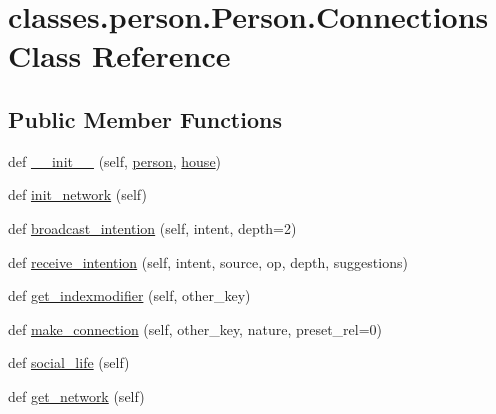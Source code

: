 \hypertarget{classclasses_1_1person_1_1Person_1_1Connections}{}\section{classes.\+person.\+Person.\+Connections Class Reference}
\label{classclasses_1_1person_1_1Person_1_1Connections}
\subsection*{Public Member Functions}
\begin{DoxyCompactItemize}
\item 
def \hyperlink{classclasses_1_1person_1_1Person_1_1Connections_a26784603675515a5591a86e2c05c235f}{\+\_\+\+\_\+init\+\_\+\+\_\+} (self, \hyperlink{classclasses_1_1person_1_1Person_1_1Connections_a7106d04e396d6fd3c4adab956767b97b}{person}, \hyperlink{classclasses_1_1person_1_1Person_1_1Connections_a80dd3f370e85960b4420131f9eddc20e}{house})
\item 
def \hyperlink{classclasses_1_1person_1_1Person_1_1Connections_ac432972c3928e6dfa3ae1566e2de914b}{init\+\_\+network} (self)
\item 
def \hyperlink{classclasses_1_1person_1_1Person_1_1Connections_a330ae3e700f3062293f1f53f617453eb}{broadcast\+\_\+intention} (self, intent, depth=2)
\item 
def \hyperlink{classclasses_1_1person_1_1Person_1_1Connections_a2e2a732543b43c94ef48e5ac1f02530e}{receive\+\_\+intention} (self, intent, source, op, depth, suggestions)
\item 
def \hyperlink{classclasses_1_1person_1_1Person_1_1Connections_afe782bf2dc9b169183e70761c89821ea}{get\+\_\+indexmodifier} (self, other\+\_\+key)
\item 
def \hyperlink{classclasses_1_1person_1_1Person_1_1Connections_ae35eecceb82d12947e2dad05e4e0feb6}{make\+\_\+connection} (self, other\+\_\+key, nature, preset\+\_\+rel=0)
\item 
def \hyperlink{classclasses_1_1person_1_1Person_1_1Connections_a65ddd5fbfc833261a0cbd4f8c4e83c9a}{social\+\_\+life} (self)
\item 
def \hyperlink{classclasses_1_1person_1_1Person_1_1Connections_a355c80c1afccdcf960616776a8f47e99}{get\+\_\+network} (self)
\end{DoxyCompactItemize}
